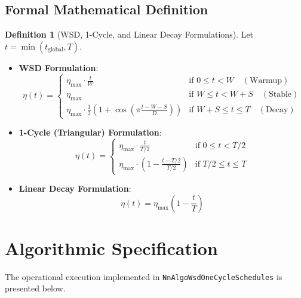 \documentclass[11pt,a4paper]{article}
\theoremstyle{definition}
\newtheorem{definition}{Definition}[section]
\begin{document}
\subsection{Formal Mathematical Definition}
\begin{definition}[WSD, 1-Cycle, and Linear Decay Formulations]
Let $t = \min(t_{\text{global}}, T)$.
\begin{itemize}
    \item \textbf{WSD Formulation}:
    \begin{equation}
    \eta(t) = \begin{cases}
    \eta_{\max} \cdot \frac{t}{W} & \text{if } 0 \le t < W \quad (\text{Warmup}) \\
    \eta_{\max} & \text{if } W \le t < W + S \quad (\text{Stable}) \\
    \eta_{\max} \cdot \frac{1}{2} \left( 1 + \cos\left( \pi \frac{t - W - S}{D} \right) \right) & \text{if } W + S \le t \le T \quad (\text{Decay})
    \end{cases} \label{eq:wsd_formula}
    \end{equation}
    \item \textbf{1-Cycle (Triangular) Formulation}:
    \begin{equation}
    \eta(t) = \begin{cases}
    \eta_{\max} \cdot \frac{t}{T/2} & \text{if } 0 \le t < T/2 \\
    \eta_{\max} \cdot \left( 1 - \frac{t - T/2}{T/2} \right) & \text{if } T/2 \le t \le T
    \end{cases}
    \end{equation}
    \item \textbf{Linear Decay Formulation}:
    \begin{equation}
    \eta(t) = \eta_{\max} \left( 1 - \frac{t}{T} \right)
    \end{equation}
\end{itemize}
\end{definition}

\section{Algorithmic Specification}

The operational execution implemented in \texttt{NnAlgoWsdOneCycleSchedules} is presented below.
\end{document}
